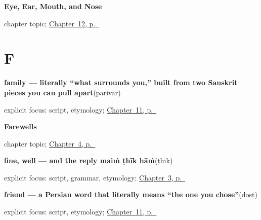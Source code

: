 \noindent\begin{minipage}[t]{\linewidth}
\raggedright
\textbf{Eye, Ear, Mouth, and Nose}\par
\footnotesize chapter topic; \hyperref[ch:pa-face-parts]{Chapter~12, p.~\pageref*{ch:pa-face-parts}}
\end{minipage}\par\smallskip

\section*{F}

\noindent\begin{minipage}[t]{\linewidth}
\raggedright
\textbf{family — literally \textquotedblleft{}what surrounds you,\textquotedblright{} built from two Sanskrit pieces you can pull apart}\enspace\emph{}\enspace(parivār)\par
\footnotesize explicit focus: script, etymology; \hyperref[ch:pa-friend-and-family]{Chapter~11, p.~\pageref*{ch:pa-friend-and-family}}
\end{minipage}\par\smallskip

\noindent\begin{minipage}[t]{\linewidth}
\raggedright
\textbf{Farewells}\par
\footnotesize chapter topic; \hyperref[ch:farewells]{Chapter~4, p.~\pageref*{ch:farewells}}
\end{minipage}\par\smallskip

\noindent\begin{minipage}[t]{\linewidth}
\raggedright
\textbf{fine, well — and the reply maiṁ ṭhīk hāṁ}\enspace\emph{}\enspace(ṭhīk)\par
\footnotesize explicit focus: script, grammar, etymology; \hyperref[ch:responding]{Chapter~3, p.~\pageref*{ch:responding}}
\end{minipage}\par\smallskip

\noindent\begin{minipage}[t]{\linewidth}
\raggedright
\textbf{friend — a Persian word that literally means \textquotedblleft{}the one you chose\textquotedblright{}}\enspace\emph{}\enspace(dost)\par
\footnotesize explicit focus: script, etymology; \hyperref[ch:pa-friend-and-family]{Chapter~11, p.~\pageref*{ch:pa-friend-and-family}}
\end{minipage}\par\smallskip

